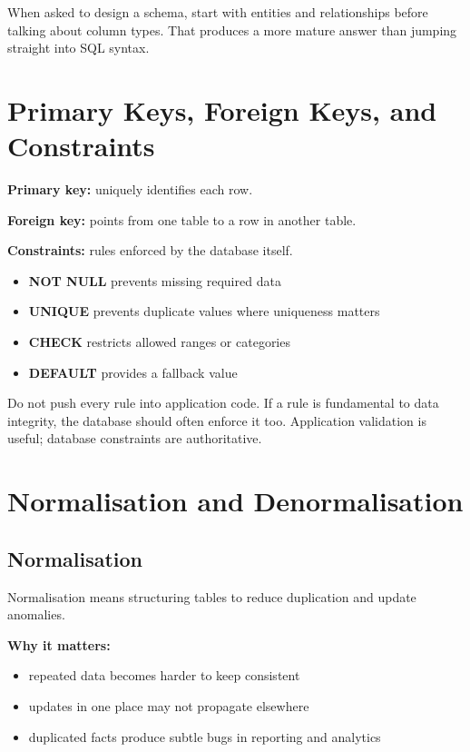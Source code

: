 \documentclass[12pt, a4paper, oneside]{book}
\begin{document}
\begin{examtipbox}
When asked to design a schema, start with entities and relationships before talking about column types. That produces a more mature answer than jumping straight into SQL syntax.
\end{examtipbox}

\section{Primary Keys, Foreign Keys, and Constraints}

\textbf{Primary key:} uniquely identifies each row.

\textbf{Foreign key:} points from one table to a row in another table.

\textbf{Constraints:} rules enforced by the database itself.

\begin{itemize}[leftmargin=2em]
    \item \textbf{NOT NULL} prevents missing required data
    \item \textbf{UNIQUE} prevents duplicate values where uniqueness matters
    \item \textbf{CHECK} restricts allowed ranges or categories
    \item \textbf{DEFAULT} provides a fallback value
\end{itemize}

\begin{warningbox}
Do not push every rule into application code. If a rule is fundamental to data integrity, the database should often enforce it too. Application validation is useful; database constraints are authoritative.
\end{warningbox}

\section{Normalisation and Denormalisation}

\subsection{Normalisation}
Normalisation means structuring tables to reduce duplication and update anomalies.

\textbf{Why it matters:}
\begin{itemize}[leftmargin=2em]
    \item repeated data becomes harder to keep consistent
    \item updates in one place may not propagate elsewhere
    \item duplicated facts produce subtle bugs in reporting and analytics
\end{itemize}
\end{document}
